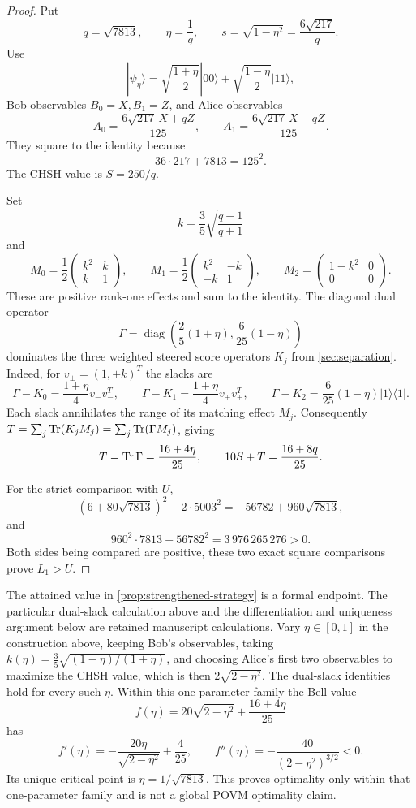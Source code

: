 \begin{proof}
Put
\[
q=\sqrt{7813},\qquad \eta=\frac1q,\qquad
s=\sqrt{1-\eta^2}=\frac{6\sqrt{217}}q.
\]
Use
\[
|\psi_\eta\rangle=
\sqrt{\frac{1+\eta}{2}}|00\rangle+
\sqrt{\frac{1-\eta}{2}}|11\rangle,
\]
Bob observables \(B_0=X,B_1=Z\), and Alice observables
\[
A_0=\frac{6\sqrt{217}\,X+qZ}{125},\qquad
A_1=\frac{6\sqrt{217}\,X-qZ}{125}.
\]
They square to the identity because
\[
36\cdot217+7813=125^2.
\]
The CHSH value is \(S=250/q\).

Set
\[
k=\frac35\sqrt{\frac{q-1}{q+1}}
\]
and
\[
M_0=\frac12\begin{pmatrix}k^2&k\\k&1\end{pmatrix},\qquad
M_1=\frac12\begin{pmatrix}k^2&-k\\-k&1\end{pmatrix},\qquad
M_2=\begin{pmatrix}1-k^2&0\\0&0\end{pmatrix}.
\]
These are positive rank-one effects and sum to the identity. The diagonal
dual operator
\[
\Gamma=
\operatorname{diag}\!\left(
\frac25(1+\eta),\frac6{25}(1-\eta)\right)
\]
dominates the three weighted steered score operators \(K_j\) from
\cref{sec:separation}. Indeed, for \(v_\pm=(1,\pm k)^T\) the slacks are
\[
\Gamma-K_0=\frac{1+\eta}{4}v_-v_-^T,\qquad
\Gamma-K_1=\frac{1+\eta}{4}v_+v_+^T,\qquad
\Gamma-K_2=\frac6{25}(1-\eta)|1\rangle\langle1|.
\]
Each slack annihilates the range of its matching effect \(M_j\).
Consequently \(T=\sum_j\operatorname{Tr}(K_jM_j)=\sum_j\operatorname{Tr}(\Gamma M_j)\), giving
\[
T=\operatorname{Tr}\Gamma=\frac{16+4\eta}{25},
\qquad
10S+T=\frac{16+8q}{25}.
\]

For the strict comparison with \(U\),
\[
(6+80\sqrt{7813})^2-2\cdot5003^2
=-56782+960\sqrt{7813},
\]
and
\[
960^2\cdot7813-56782^2=3\,976\,265\,276>0.
\]
Both sides being compared are positive, these two exact square comparisons
prove \(L_1>U\).
\end{proof}

\begin{remark}
The attained value in \cref{prop:strengthened-strategy} is a formal endpoint.
The particular dual-slack calculation above and the differentiation and
uniqueness argument below are retained manuscript calculations.
Vary \(\eta\in[0,1]\) in the construction above, keeping Bob's observables,
taking \(k(\eta)=\frac35\sqrt{(1-\eta)/(1+\eta)}\), and choosing Alice's
first two observables to maximize the CHSH value, which is then
\(2\sqrt{2-\eta^2}\). The dual-slack identities hold for every such
\(\eta\). Within this one-parameter family the Bell value
\[
f(\eta)=20\sqrt{2-\eta^2}+\frac{16+4\eta}{25}
\]
has
\[
f'(\eta)=-\frac{20\eta}{\sqrt{2-\eta^2}}+\frac4{25},\qquad
f''(\eta)=-\frac{40}{(2-\eta^2)^{3/2}}<0.
\]
Its unique critical point is \(\eta=1/\sqrt{7813}\). This proves optimality
only within that one-parameter family and is not a global POVM optimality
claim.
\end{remark}

